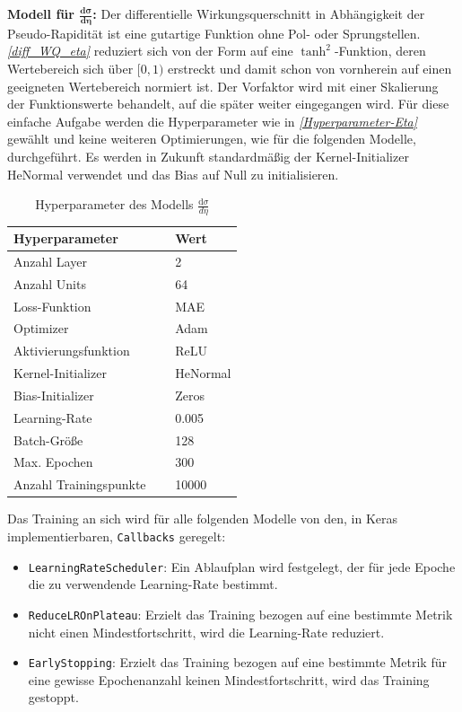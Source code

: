 \textbf{Modell für $\mathbf{\frac{d\sigma}{d\eta}}$:} 
Der differentielle Wirkungsquerschnitt in Abhängigkeit der Pseudo-Rapidität ist eine gutartige Funktion ohne Pol- oder Sprungstellen. \textit{\autoref{diff_WQ_eta}} reduziert sich von der Form auf eine $\tanh^2$-Funktion, deren Wertebereich sich über $[0,1)$ erstreckt und damit schon von vornherein auf einen geeigneten Wertebereich normiert ist. Der Vorfaktor wird mit einer Skalierung der Funktionswerte behandelt, auf die später weiter eingegangen wird. 
Für diese einfache Aufgabe werden die Hyperparameter wie in \textit{\autoref{Hyperparameter-Eta}} gewählt und keine weiteren Optimierungen, wie für die folgenden Modelle, durchgeführt. Es werden in Zukunft standardmäßig der Kernel-Initializer {HeNormal} verwendet und das Bias auf Null zu initialisieren.
\begin{table}[hbt]
	\centering
	\begin{tabular}{ll}
		Hyperparameter & Wert \\
		\hline \hline
		Anzahl Layer & 2 \\
		Anzahl Units & 64 \\
		Loss-Funktion & MAE \\
		Optimizer & Adam \\
		Aktivierungsfunktion & ReLU \\
		Kernel-Initializer & HeNormal \\
		Bias-Initializer & Zeros \\
		Learning-Rate & 0.005 \\
		Batch-Größe & 128 \\
		Max. Epochen & 300 \\
		Anzahl Trainingspunkte $\quad$& 10000\\
	\end{tabular}
	\caption{Hyperparameter des Modells $\frac{\text{d}\sigma}{d\eta}$}
	\label{Hyperparameter-Eta}
\end{table}
Das Training an sich wird für alle folgenden Modelle von den, in Keras implementierbaren, \texttt{Callbacks} geregelt:
\begin{itemize}
	\setlength\itemsep{0cm}
	\setlength{\parskip}{0cm}
	\item \texttt{LearningRateScheduler}: Ein Ablaufplan wird festgelegt, der für jede Epoche die zu verwendende Learning-Rate bestimmt. 
	\item \texttt{ReduceLROnPlateau}: Erzielt das Training bezogen auf eine bestimmte Metrik nicht einen Mindestfortschritt, wird die Learning-Rate reduziert.
	\item \texttt{EarlyStopping}: Erzielt das Training bezogen auf eine bestimmte Metrik für eine gewisse Epochenanzahl keinen Mindestfortschritt, wird das Training gestoppt.
\end{itemize}
